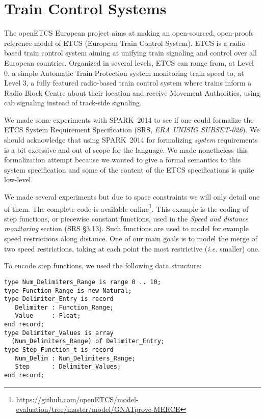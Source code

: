 \documentclass[10pt,a4paper,twocolumn]{article}
\newcommand{\openetcs}{openETCS\xspace}
\newcommand{\newspark}{SPARK~2014\xspace}
\newcommand{\ie}{\textit{i.e.}\xspace}
\begin{document}
\section{Train Control Systems}
\label{sec:openETCS}



The \openetcs European project aims at making an open-sourced,
open-proofs reference model of ETCS (European Train Control
System). ETCS is a radio-based train control system aiming at unifying
train signaling and control over all European countries. Organized in
several levels, ETCS can range from, at Level 0, a simple Automatic
Train Protection system monitoring train speed to, at Level 3, a fully
featured radio-based train control system where trains inform a Radio
Block Centre about their location and receive Movement Authorities,
using cab signaling instead of track-side signaling.

We made some experiments with \newspark to see if one could formalize
the ETCS System Requirement Specification (SRS, \emph{ERA UNISIG
SUBSET-026}). We should acknowledge that using \newspark for
formalizing \emph{system} requirements is a bit excessive and out of
scope for the language. We made nonetheless this formalization attempt
because we wanted to give a formal semantics to this system
specification and some of the content of the ETCS specifications is
quite low-level.


We made several experiments but due to space constraints we will only
detail one of them. The complete code is available
online\footnote{\url{https://github.com/openETCS/model-evaluation/tree/master/model/GNATprove-MERCE}}.
This example is the coding of step functions, or piecewise constant
functions, used in the \textit{Speed and distance monitoring} section
(SRS §3.13). Such functions are used to model for example speed
restrictions along distance. One of our main goals is to model the
merge of two speed restrictions, taking at each point the most
restrictive (\ie smaller) one.

To encode step functions, we used the following data structure:
\begin{lstlisting}
type Num_Delimiters_Range is range 0 .. 10;
type Function_Range is new Natural;
type Delimiter_Entry is record
   Delimiter : Function_Range;
   Value     : Float;
end record;
type Delimiter_Values is array
  (Num_Delimiters_Range) of Delimiter_Entry;
type Step_Function_t is record
   Num_Delim : Num_Delimiters_Range;
   Step      : Delimiter_Values;
end record;
\end{lstlisting}
\end{document}
